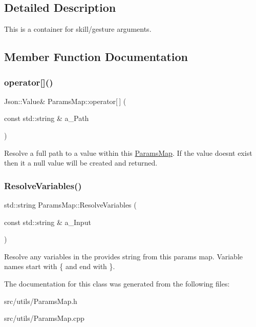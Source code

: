 \subsection{Detailed Description}
This is a container for skill/gesture arguments. 

\subsection{Member Function Documentation}
\mbox{\label{class_params_map_a8a33e06714e2955ce0b81d27a8b59da2}} 
\subsubsection{\texorpdfstring{operator[]()}{operator[]()}}
{\footnotesize\ttfamily Json\+::\+Value\& Params\+Map\+::operator\mbox{[}$\,$\mbox{]} (\begin{DoxyParamCaption}\item[{const std\+::string \&}]{a\+\_\+\+Path }\end{DoxyParamCaption})\hspace{0.3cm}{\ttfamily [inline]}}

Resolve a full path to a value within this \hyperlink{class_params_map}{Params\+Map}. If the value doesn\textquotesingle{}t exist then it a null value will be created and returned. \mbox{\label{class_params_map_ab78106a273b59aee641d5cef3b561c20}} 
\subsubsection{\texorpdfstring{Resolve\+Variables()}{ResolveVariables()}}
{\footnotesize\ttfamily std\+::string Params\+Map\+::\+Resolve\+Variables (\begin{DoxyParamCaption}\item[{const std\+::string \&}]{a\+\_\+\+Input }\end{DoxyParamCaption})}

Resolve any variables in the provides string from this params map. Variable names start with \{ and end with \}. 

The documentation for this class was generated from the following files\+:\begin{DoxyCompactItemize}
\item 
src/utils/Params\+Map.\+h\item 
src/utils/Params\+Map.\+cpp\end{DoxyCompactItemize}
